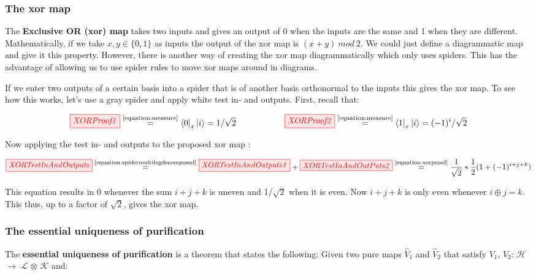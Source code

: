 \documentclass[]{article}
\newcommand{\equaltext}[1]{\ensuremath{\stackrel{\text{#1}}{=}}}
\begin{document}
\subsubsection{The xor map}

\label{xorgate}

The \textbf{Exclusive OR (xor) map} takes two inputs and gives an output of 0 when the inputs are the same and 1 when they are different. Mathematically, if we take $x, y \in \{0,1\} $ as inputs the output of the xor map is $(x + y)~mod~2$. We could just define a diagrammatic map and give it this property. However, there is another way of creating the xor map diagrammatically which only uses spiders. This has the advantage of allowing us to use spider rules to move xor maps around in diagrams.

If we enter two outputs of a certain basis into a spider that is of another basis orthonormal to the inputs this gives the xor map. To see how this works, let's use a gray spider and apply white test in- and outputs. First, recall that:

\begin{equation}
\label{equation:xorproof}
	\tikzfig{XORProof1} \equaltext{\ref{equation:measure}} \bra{0}_x\ket{i} =  1/\sqrt{2} ~~~~~~~~~~~~~~~~~ \tikzfig{XORProof2} \equaltext{\ref{equation:measure}} \bra{1}_x\ket{i} = (-1)^i/\sqrt{2}
\end{equation}

Now applying the test in- and outputs to the proposed xor map \cite{Coecke2017}:

\begin{equation}
	\label{equation:xormap}
	\tikzfig{XORTestInAndOutputs} \equaltext{\ref{equation:spidermultilegdecomposed}} \tikzfig{XORTestInAndOutputs1} + \tikzfig{XORTestInAndOutPuts2} \equaltext{\ref{equation:xorproof}} \frac{1}{\sqrt{2}} * \frac{1}{2}(1+(-1)^{i+j+k})
\end{equation}

This equation results in 0 whenever the sum $i+j+k$ is uneven and 1/$\sqrt{2}$ when it is even. Now $i+j+k$ is only even whenever $i \oplus j = k$. This thus, up to a factor of $\sqrt{2}$, gives the xor map.

\subsubsection{The essential uniqueness of purification}
\label{section:essentialuniqueness}

The \textbf{essential uniqueness of purification} is a theorem that states the following: Given two pure maps $\hat{V}_1$ and $\hat{V}_2$ that satisfy $V_1$, $V_2$: $\mathcal{H}$ $\rightarrow$ $\mathcal{L}$ $\otimes$ $\mathcal{K}$ and:
\end{document}
